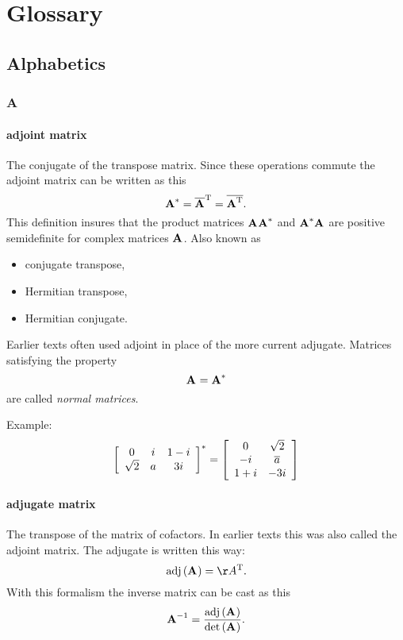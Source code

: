 \chapter{Glossary}

\section*{Alphabetics}

\subsection*{A} 

\subsubsection*{adjoint matrix}
The conjugate of the transpose matrix. Since these operations commute the adjoint matrix can be written as this
\begin{equation}
  \A{*} = \overline{\A{}}^{\mathrm{T}} = \overline{\A{T}}.
\end{equation}
This definition insures that the product matrices $\A{}\A{*}$ and $\A{*}\A{}$ are positive semidefinite for complex matrices $\A{}$.
Also known as 
\begin{itemize}
\item conjugate transpose,
\item Hermitian transpose,
\item Hermitian conjugate.
\end{itemize}
Earlier texts often used adjoint in place of the more current adjugate. Matrices satisfying the property
\begin{equation}
  \A{}=\A{*}
\end{equation}
are called \textit{normal matrices}.

Example:
\begin{equation}
\mat{ccc}
{
0 & i & 1-i \\
\sqrt{2} & a & 3i
}^{*}
=
\mat{cc}
{
0  & \sqrt{2}\\
-i & \overline{a} \\
1+i& -3i
}
\end{equation}

\subsubsection*{adjugate matrix}
The transpose of the matrix of cofactors. In earlier texts this was also called the adjoint matrix. The adjugate is written this way:
\begin{equation}
  \text{adj}\paren{\A{}}=\AA^{\mathrm{T}}.
\end{equation}
With this formalism the inverse matrix can be cast as this
\begin{equation}
  \A{-1}=\frac{\text{adj}\paren{\A{}}}{\det \paren{\A{}}}.
\end{equation}

